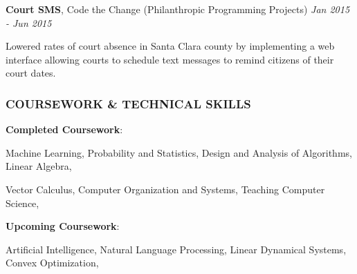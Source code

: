\documentclass[11pt,letterpaper]{article}%
\begin{document}
\vspace{-.3em}
\hspace{.6em}  
{\bf Court SMS}, Code the Change (Philanthropic Programming Projects) \hfill \textit{Jan 2015 - Jun 2015}
\vspace{-.4em}
\begin{itemize*}
\item Lowered rates of court absence in Santa Clara county by implementing a web interface allowing courts to schedule text messages to remind citizens of their court dates.
\end{itemize*}


\vspace{-1em}
\hrulefill 
\subsubsection*{COURSEWORK \& TECHNICAL SKILLS}
\vspace{-1ex}
\hrulefill

\hspace{.6em} 
{\bf Completed Coursework}: 

\hspace{2.4em}
Machine Learning,
Probability and Statistics, 
Design and Analysis of Algorithms, 
Linear Algebra,

\hspace{2.4em}
Vector Calculus,
Computer Organization and Systems, 
Teaching Computer Science,

\hspace{.6em}
{\bf Upcoming Coursework}:

\hspace{2.4em}
Artificial Intelligence, 
Natural Language Processing,
Linear Dynamical Systems,
Convex Optimization,
\end{document}
